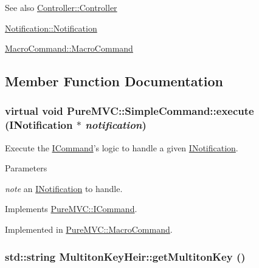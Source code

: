\begin{DoxySeeAlso}{See also}
\hyperlink{class_pure_m_v_c_1_1_controller_a95c56822d667e94b031451729ce069a9}{Controller::Controller} 

\hyperlink{class_pure_m_v_c_1_1_notification_a6c2e3395ec9cc6f7b6f974ed15107067}{Notification::Notification} 

\hyperlink{class_pure_m_v_c_1_1_macro_command_abf91c7c1114f20b006cf95bf8c4614e7}{MacroCommand::MacroCommand} 
\end{DoxySeeAlso}


\subsection{Member Function Documentation}
\hypertarget{class_pure_m_v_c_1_1_simple_command_af3f75f1ff33ba4afabec5ee2a8a83d20}{
\subsubsection[{execute}]{\setlength{\rightskip}{0pt plus 5cm}virtual void PureMVC::SimpleCommand::execute ({\bf INotification} $\ast$ {\em notification})}}
\label{class_pure_m_v_c_1_1_simple_command_af3f75f1ff33ba4afabec5ee2a8a83d20}


Execute the {\ttfamily \hyperlink{class_pure_m_v_c_1_1_i_command}{ICommand}}'s logic to handle a given {\ttfamily \hyperlink{class_pure_m_v_c_1_1_i_notification}{INotification}}. 
\begin{DoxyParams}{Parameters}
\item[{\em note}]an {\ttfamily \hyperlink{class_pure_m_v_c_1_1_i_notification}{INotification}} to handle. \end{DoxyParams}


Implements \hyperlink{class_pure_m_v_c_1_1_i_command_a901132c675301f8e82b1739b54a396b3}{PureMVC::ICommand}.

Implemented in \hyperlink{class_pure_m_v_c_1_1_macro_command_a23d3bdc5519b108646e1b169e5eaa219}{PureMVC::MacroCommand}.\hypertarget{class_pure_m_v_c_1_1_multiton_key_heir_aa5622459d33380deb08dc3cab8b991c7}{
\subsubsection[{getMultitonKey}]{\setlength{\rightskip}{0pt plus 5cm}std::string MultitonKeyHeir::getMultitonKey ()}}
\label{class_pure_m_v_c_1_1_multiton_key_heir_aa5622459d33380deb08dc3cab8b991c7}


